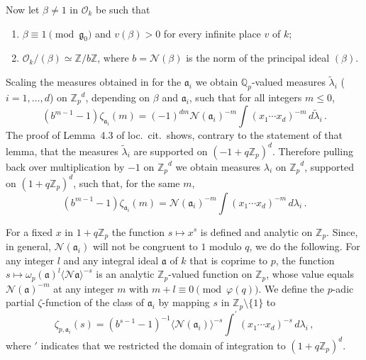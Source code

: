 \documentclass{amsart}
\begin{document}
Now let $\beta\ne1 $ in $ \mathcal{O}_k$ be such that 
\begin{enumerate}
\item 
$\beta \equiv 1 \pmod{\mathfrak{g}_0}$ and $v(\beta) > 0$ for every infinite place $v$
of $k$;

\item
${{\mathcal O}_k}/(\beta) \simeq {\mathbb Z}/b{\mathbb Z}$, where $b = \mathcal{N}(\beta)$ is the norm of the principal
  ideal $(\beta)$.
\end{enumerate}
Scaling the measures obtained in \cite[Lemme~4.4]{Colm88} for the $ \mathfrak{a}_i $ we obtain $ {{\mathbb Q_p}} $-valued measures
$\widetilde\lambda_i$ ($ i=1,\dots,d $) on ${\mathbb Z_p}^d$, depending on $\beta$ and $\mathfrak{a}_i$, such that
for all integers $m\le0$,
\[
(b^{m-1}-1) \zeta_{\mathfrak{a}_i}(m) = (-1)^{dm}
\mathcal{N}(\mathfrak{a}_i)^{-m} \int (x_1\cdots x_d)^{-m} \, d\widetilde\lambda_i
\,.
\]
The proof of Lemma~4.3 of loc.\ cit.\ shows, contrary to the statement
of that lemma, that the measures $\widetilde\lambda_i$ are supported
on $ (-1+q{\mathbb Z_p})^d $.  Therefore pulling back over multiplication
by $ -1 $ on $ {\mathbb Z_p}^d $ we obtain measures $ \lambda_i $ on $ {\mathbb Z_p}^d $,
supported on $(1+q{\mathbb Z_p})^d$, such that, for the same $ m $,
\begin{equation}\label{mnonpositive}
(b^{m-1}-1) \zeta_{\mathfrak{a}_i}(m) = 
\mathcal{N}(\mathfrak{a}_i)^{-m} \int (x_1\cdots x_d)^{-m} \, d\lambda_i
\,.
\end{equation}

For a fixed $x$ in $1 + q{\mathbb Z_p}$ the function $s \mapsto x^s$ is defined
and analytic on $ {\mathbb Z_p} $.  Since, in general, 
$\mathcal{N}(\mathfrak{a}_i)$ will not be congruent to $1$ modulo $q$,
we do the following.  For any integer $l$ and any
integral ideal $\mathfrak{a}$ of $k$ that is coprime to $p$, the 
function $s \mapsto \omega_p(\mathfrak{a})^l \langle
\mathcal{N}\mathfrak{a} \rangle^{-s}$ is an analytic ${\mathbb Z_p}$-valued
function on $ {\mathbb Z_p} $, whose value equals $ \mathcal{N}(\mathfrak{a})^{-m}$ at any
integer $m$ with $m + l \equiv 0 \pmod{\varphi(q)}$. 
We define the $p$-adic partial $ \zeta $-function of the class of $\mathfrak{a}_i$
by mapping $ s $ in ${\mathbb Z_p} \setminus \{1\}$ to
\begin{equation*}
  \zeta_{p, \mathfrak{a}_i}(s) = 
  \left(b^{s-1} - 1\right)^{-1}
  \langle \mathcal{N}(\mathfrak{a}_i) \rangle^{-s} 
  {\int^{\prime}} (x_1 \cdots x_d)^{-s} \, d\lambda_i \,,
\end{equation*}
where $ ' $ indicates that we restricted the domain of integration to $ (1+q{\mathbb Z_p})^d $.
\end{document}
